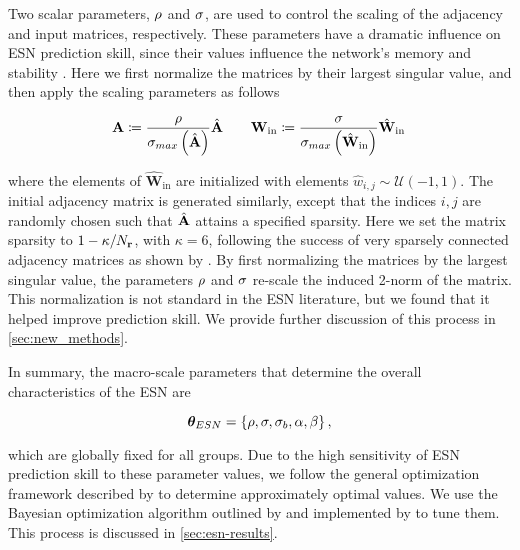 Two scalar parameters, $\rho$ and $\sigma$,
are used to control the scaling of the adjacency and input matrices,
respectively.
These parameters have a dramatic influence on ESN prediction skill, since their values influence the network's memory and stability
\citep{lukosevicius_practical_2012,hermans_memory_2010}.
Here we first normalize the matrices by their largest singular value, and then
apply the scaling parameters as follows
\begin{linenomath*}\begin{equation*}
    \mathbf{A} \coloneqq
    \dfrac{\rho}{\sigma_{max}\left(\hat{\mathbf{A}}\right)}
    \hat{\mathbf{A}}
    \qquad
    \mathbf{W}_\text{in} \coloneqq
    \dfrac{\sigma}{\sigma_{max}\left(\hat{\mathbf{W}}_\text{in}\right)}
    \hat{\mathbf{W}}_\text{in} \,
\end{equation*}\end{linenomath*}
where the elements of $\hat{\mathbf{W}}_\text{in}$
are initialized with elements $\hat{w}_{i,j}\sim\mathcal{U}(-1,1)$.
The initial adjacency matrix is generated similarly, except that the indices
$i,j$ are randomly chosen such that $\hat{\mathbf{A}}$ attains a specified
sparsity.
Here we set the matrix sparsity to $1 - \kappa / N_{\mathbf{r}}$, with $\kappa=6$,
following the success of very sparsely connected adjacency matrices as shown by
\citet{griffith_forecasting_2019}.
By first normalizing the matrices by the largest singular value, the parameters
$\rho$ and $\sigma$ re-scale the induced 2-norm of
the matrix.
This normalization is not standard in the ESN literature, but we found that it
helped improve prediction skill.
We provide further discussion of this process in \cref{sec:new_methods}.

In summary, the macro-scale parameters that determine the overall
characteristics of the ESN are

\begin{linenomath*}\begin{equation}
    \bm{\theta}_{ESN} =
    \{ \rho, \sigma, \sigma_{b}, \alpha, \beta \} \,
    ,
    \label{eq:rc-hyperparameters}
\end{equation}\end{linenomath*}
which are globally fixed for all groups.
Due to the high sensitivity of ESN prediction skill to these parameter values,
we follow the general optimization framework described by
\citet{platt_systematic_2022} to determine approximately optimal values.
We use the Bayesian optimization algorithm outlined by
\citet{jones_efficient_1998} and implemented by \citet{bouhlel_python_2019} to tune them.
This process is discussed in \cref{sec:esn-results}.
